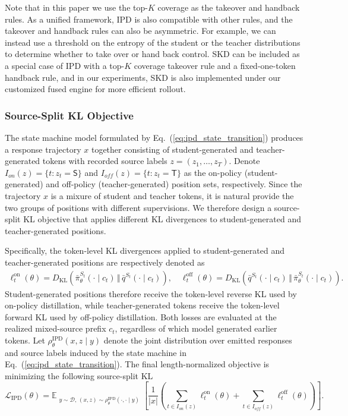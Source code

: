\documentclass{article} %
\begin{document}
Note that in this paper we use the top-$K$ coverage as the takeover and handback rules. As a unified framework, IPD is also compatible with other rules, and the takeover and handback rules can also be asymmetric. For example, we can instead use a threshold on the entropy of the student or the teacher distributions to determine whether to take over or hand back control. SKD \citep{skd} can be included as a special case of IPD with a top-$K$ coverage takeover rule and a fixed-one-token handback rule, and in our experiments, SKD is also implemented under our customized fused engine for more efficient rollout.

\subsubsection{Source-Split KL Objective}

The state machine model formulated by Eq.~(\ref{eq:ipd_state_transition}) produces a response trajectory $x$ together consisting of student-generated and teacher-generated tokens with recorded source labels $z=(z_1,\ldots,z_{T})$. Denote $I_{on}(z)=\{t:z_t=\mathsf{S}\}$ and $I_{off}(z)=\{t:z_t=\mathsf{T}\}$ as the on-policy (student-generated) and off-policy (teacher-generated) position sets, respectively. Since the trajectory $x$ is a mixure of student and teacher tokens, it is natural provide the two groups of positions with different supervisions. We therefore design a source-split KL objective that applies different KL divergences to student-generated and teacher-generated positions.

Specifically, the token-level KL divergences applied to student-generated and teacher-generated positions are respectively denoted as 
\begin{align}
    \ell_t^{\mathrm{on}}(\theta)
    =D_{\mathrm{KL}}\!\left(\bar{\pi}^{S_t}_\theta(\cdot\mid c_t)\,\Vert\,\bar{q}^{S_t}(\cdot\mid c_t)\right), \quad
    \ell_t^{\mathrm{off}}(\theta)
    =D_{\mathrm{KL}}\!\left(\bar{q}^{S_t}(\cdot\mid c_t)\,\Vert\,\bar{\pi}^{S_t}_\theta(\cdot\mid c_t)\right). \label{eq:ipd_off_loss}
\end{align}
Student-generated positions therefore receive the token-level reverse KL used by on-policy distillation, while teacher-generated tokens receive the token-level forward KL used by off-policy distillation. Both losses are evaluated at the realized mixed-source prefix $c_t$, regardless of which model generated earlier tokens.
Let $\rho_\theta^{\mathrm{IPD}}(x,z\mid y)$ denote the joint distribution over emitted responses and source labels induced by the state machine in Eq.~(\ref{eq:ipd_state_transition}). The final length-normalized objective is minimizing the following source-split KL
\begin{equation}
    \mathcal{L}_{\mathrm{IPD}}(\theta)=\mathbb{E}_{\substack{y\sim\mathcal{D},\,(x,z)\sim\rho_\theta^{\mathrm{IPD}}(\cdot,\cdot\mid y)}}\!\left[\frac{1}{|x|}\left(\sum_{t\in I_{on}(z)}\ell_t^{\mathrm{on}}(\theta)+\sum_{t\in I_{off}(z)}\ell_t^{\mathrm{off}}(\theta)\right)\right].
    \label{eq:ipd_objective}
\end{equation}
\end{document}
